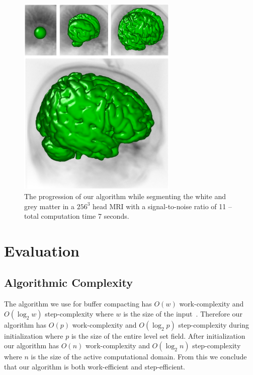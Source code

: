 \documentclass{egpubl}
\newcommand{\leftbracket}{\left(}
\newcommand{\rightbracket}{\right)}
\begin{document}
{{%
\begin{figure}[t]
\centering
\includegraphics[width=3.0in]{figures/Brainweb-3D-Composite-Offset.png}
\caption{ The progression of our algorithm while segmenting the white and grey matter in a $256^3$ head MRI with a signal-to-noise ratio of 11 -- total computation time 7 seconds. }
\label{fig:brainweb3d}
\end{figure}


\section{Evaluation}
\label{sec:evaluation}


\subsection{Algorithmic Complexity}
\label{subsec:algorithmicComplexity}

The algorithm we use for buffer compacting has $O(w)$ work-complexity and $O({\log }_{2}w)$ step-complexity where $w$ is the size of the input~\cite{Harris-2007,Sengupta-2007,Sengupta-2008}. Therefore our algorithm has $O(p)$ work-complexity and $ O \leftbracket { \log }_2 p \rightbracket $ step-complexity during initialization where $p$ is the size of the entire level set field. After initialization our algorithm has $O(n)$ work-complexity and $ O \leftbracket { \log }_2 n \rightbracket $ step-complexity where $n$ is the size of the active computational domain. From this we conclude that our algorithm is both work-efficient and step-efficient.

}}
\end{document}

